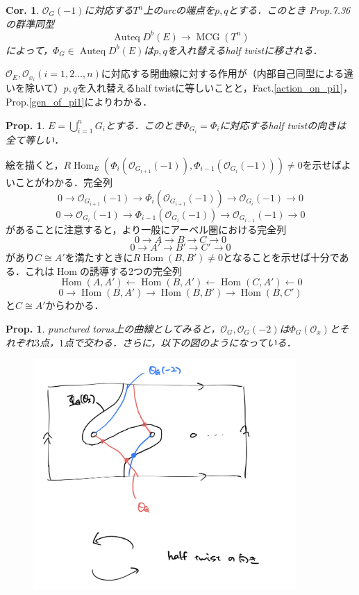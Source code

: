 \documentclass[uplatex,a4paper,11pt,dvipdfmx]{jsarticle}
\makeatletter
\theoremstyle{mystyle} %
\newtheorem{proposition}[theorem]{Prop.}
\newtheorem{corollary}[theorem]{Cor.}
\renewenvironment{proof}[1][\proofname]{\par
 \pushQED{\qed}%
 \normalfont \topsep6\p@\@plus6\p@\relax
 \trivlist
 \item[\hskip\labelsep
 \itshape
 {\bf\underline{#1}}]\ignorespaces
}{%
 \popQED\endtrivlist\@endpefalse
}
\DeclareMathOperator{\Auteq}{Auteq}\DeclareMathOperator{\Coh}{Coh}
\DeclareMathOperator{\Hom}{Hom}
\DeclareMathOperator{\MCG}{MCG}
\makeatother
\begin{document}
\begin{corollary}
	$\mathcal{O}_G(-1)$に対応する$T^n$上のarcの端点を$p, q$とする．このとき\cite{Opp20} Prop.7.36 の群準同型$$\Auteq D^b(E) \to \MCG(T^n)$$によって，$\Phi_G \in \Auteq D^b(E)$は$p, q$を入れ替えるhalf twistに移される．
\end{corollary}
\begin{proof}
	$\mathcal{O}_E, \mathcal{O}_{x_i}(i=1,2 \dots, n)$に対応する閉曲線に対する作用が（内部自己同型による違いを除いて）$p, q$を入れ替えるhalf twistに等しいことと，Fact.\ref{action_on_pi1}，Prop.\ref{gen_of_pi1}によりわかる．
\end{proof}
\begin{proposition}
	$E = \bigcup_{i=1}^n G_i$とする．このとき$\Phi_{G_i} = \Phi_i$に対応するhalf twistの向きは全て等しい．
\end{proposition}
\begin{proof}
	絵を描くと，$R\Hom_E(\Phi_{i}(\mathcal{O}_{G_{i+1}}(-1)), \Phi_{i-1}(\mathcal{O}_{G_i}(-1))) \neq 0$を示せばよいことがわかる．完全列$$0 \to \mathcal{O}_{G_{i+1}}(-1) \to \Phi_i(\mathcal{O}_{G_{i+1}}(-1)) \to \mathcal{O}_{G_i}
		(-1) \to 0$$
	$$0 \to \mathcal{O}_{G_{i}}(-1) \to \Phi_{i-1}(\mathcal{O}_{G_{i}}(-1)) \to \mathcal{O}_{G_{i-1}}
		(-1) \to 0$$があることに注意すると，より一般にアーベル圏における完全列$$0 \to A \to B \to C
		\to 0$$$$0 \to A' \to B' \to C' \to 0$$があり$C \cong A'$を満たすときに$R\Hom(B, B') \neq 0$となることを示せば十分である．これは$\Hom$の誘導する2つの完全列$$\Hom (A, A') \leftarrow \Hom(B, A') \leftarrow \Hom(C, A') \leftarrow 0$$$$0 \to \Hom(B, A') \to \Hom(B, B') \to \Hom(B, C') $$と$C \cong A'$からわかる．
\end{proof}
\begin{proposition}
	punctured torus上の曲線としてみると，$\mathcal{O}_G, \mathcal{O}_G(-2)$は$\Phi_G(\mathcal{O}_x)$とそれぞれ$3$点，$1$点で交わる．さらに，以下の図のようになっている．
	\begin{figure}[htbp]
		\begin{center}
			\includegraphics[width=100mm]{IMG_B22E74A08E22-1.jpeg}
		\end{center}
	\end{figure}


\end{proposition}
\end{document}
